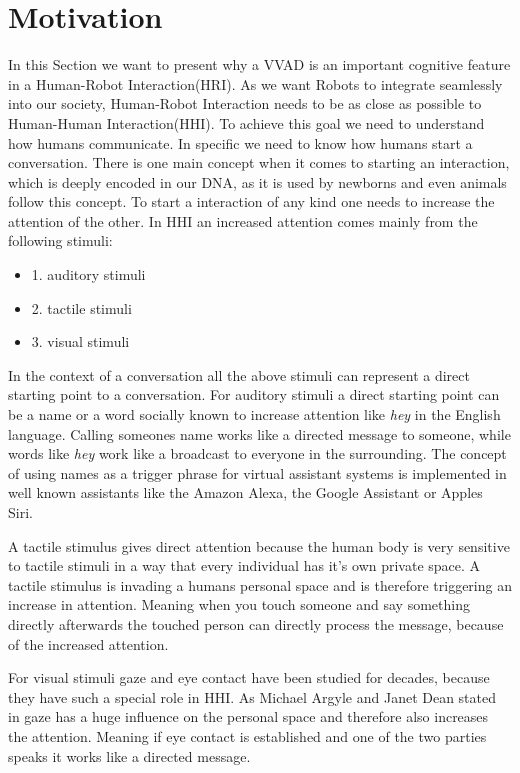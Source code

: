 \section{Motivation}\label{sec:motivation}
In this Section we want to present why a VVAD is an important cognitive feature in a Human-Robot Interaction(HRI).
As we want Robots to integrate seamlessly into our society, Human-Robot Interaction needs to be as close as possible to Human-Human Interaction(HHI). To achieve this goal we need to understand how humans communicate.
In specific we need to know how humans start a conversation.
There is one main concept when it comes to starting an interaction, which is deeply encoded in our DNA, as it is used by newborns and even animals follow this concept. To start a interaction of any kind one needs to increase the attention of the other. In HHI an increased attention comes mainly from the following stimuli:
\begin{itemize}
  \item {1.} auditory stimuli
  \item {2.} tactile stimuli
  \item {3.} visual stimuli
\end{itemize}
In the context of a conversation all the above stimuli can represent a direct starting point to a conversation.
For auditory stimuli a direct starting point can be a name or a word socially known to increase attention
like \emph{hey} in the English language. Calling someones name works like a directed message to someone, while words like \emph{hey} work like a broadcast to everyone in the surrounding. The concept of using names as a trigger phrase for virtual assistant systems is implemented in well known assistants like the Amazon Alexa, the Google Assistant or Apples Siri.

A tactile stimulus gives direct attention because the human body is very sensitive to tactile stimuli in a way that every individual has it's own private space. A tactile stimulus is invading a humans personal space and is therefore triggering an increase in attention. Meaning when you touch someone and say something directly afterwards the touched person can directly process the message, because of the increased attention.

For visual stimuli gaze and eye contact have been studied for decades, because they have such a special role in HHI. As Michael Argyle and Janet Dean stated in \cite{ARGYLE1965} gaze has a huge influence on the personal space and therefore also increases the attention. Meaning if eye contact is established and one of the two parties speaks it works like a directed message.


